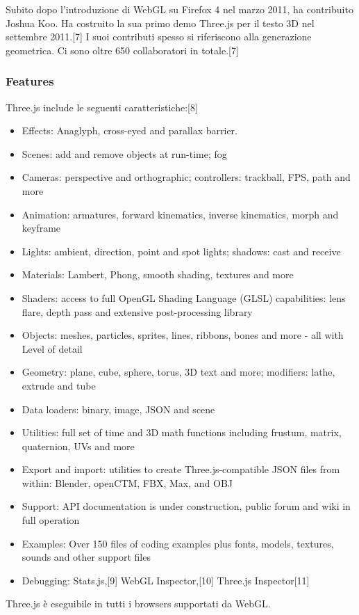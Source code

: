 Subito dopo l'introduzione di WebGL su Firefox 4 nel marzo 2011, ha contribuito Joshua Koo. Ha costruito la sua
primo demo Three.js per il testo 3D nel settembre 2011.[7] I suoi contributi spesso si riferiscono alla generazione geometrica.
Ci sono oltre 650 collaboratori in totale.[7]

\subsubsection{Features}
Three.js include le seguenti caratteristiche:[8]
\begin{itemize}

\item Effects: Anaglyph, cross-eyed and parallax barrier.
\item Scenes: add and remove objects at run-time; fog
\item Cameras: perspective and orthographic; controllers: trackball, FPS, path and more
\item Animation: armatures, forward kinematics, inverse kinematics, morph and keyframe
\item Lights: ambient, direction, point and spot lights; shadows: cast and receive
\item Materials: Lambert, Phong, smooth shading, textures and more
\item Shaders: access to full OpenGL Shading Language (GLSL) capabilities: lens flare, depth pass and extensive post-processing library
\item Objects: meshes, particles, sprites, lines, ribbons, bones and more - all with Level of detail
\item Geometry: plane, cube, sphere, torus, 3D text and more; modifiers: lathe, extrude and tube
\item Data loaders: binary, image, JSON and scene
\item Utilities: full set of time and 3D math functions including frustum, matrix, quaternion, UVs and more
\item Export and import: utilities to create Three.js-compatible JSON files from within: Blender, openCTM, FBX, Max, and OBJ
\item Support: API documentation is under construction, public forum and wiki in full operation
\item Examples: Over 150 files of coding examples plus fonts, models, textures, sounds and other support files
\item Debugging: Stats.js,[9] WebGL Inspector,[10] Three.js Inspector[11]
\end{itemize}

Three.js \`e eseguibile in tutti i browsers supportati da WebGL.
